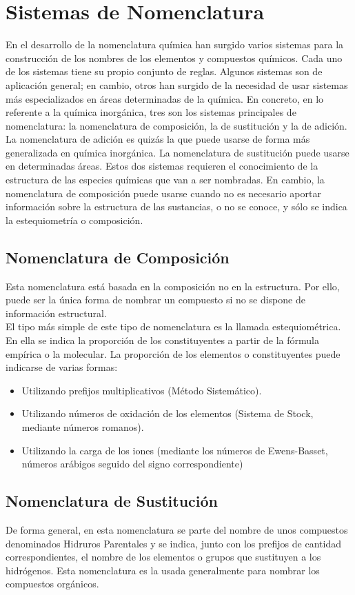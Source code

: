 \section{Sistemas de Nomenclatura}
En el desarrollo de la nomenclatura química han surgido varios sistemas para la construcción de los nombres de los elementos y compuestos químicos. Cada uno de los sistemas tiene su propio conjunto de reglas.
Algunos sistemas son de aplicación general; en cambio, otros han surgido de la necesidad de usar sistemas más especializados en áreas determinadas de la química.
En concreto, en lo referente a la química inorgánica, tres son los sistemas principales de nomenclatura: la nomenclatura de composición, la de sustitución y la de adición.
La nomenclatura de adición es quizás la que puede usarse de forma más generalizada en química inorgánica. La nomenclatura de sustitución puede usarse en determinadas áreas. Estos dos sistemas requieren el conocimiento de la estructura de las especies químicas que van a ser nombradas. En cambio, la nomenclatura de composición puede usarse cuando no es necesario aportar información sobre la estructura de las sustancias, o no se conoce, y sólo se indica la estequiometría o composición.

\subsection{Nomenclatura de Composición}
Esta nomenclatura está basada en la composición no en la estructura. Por ello, puede ser la única forma de nombrar un compuesto si no se dispone de información estructural.\\
El tipo más simple de este tipo de nomenclatura es la llamada estequiométrica. En ella se indica la proporción de los constituyentes a partir de la fórmula empírica o la molecular. La proporción de los elementos o constituyentes puede indicarse de varias formas:\\
\begin{itemize}
	\item Utilizando prefijos multiplicativos (Método Sistemático). 
	\item Utilizando números de oxidación de los elementos (Sistema de Stock, mediante números romanos). 
	\item Utilizando la carga de los iones (mediante los números de Ewens-Basset, números arábigos seguido del signo correspondiente)
\end{itemize}
\subsection{Nomenclatura de Sustitución}
De forma general, en esta nomenclatura se parte del nombre de unos compuestos denominados Hidruros Parentales y se indica, junto con los prefijos de cantidad correspondientes, el nombre de los elementos o grupos que sustituyen a los hidrógenos. Esta nomenclatura es la usada generalmente para nombrar los compuestos orgánicos.
